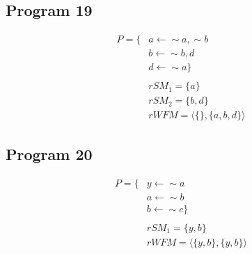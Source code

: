 \subsection{Program 19}
\begin{align*}
P=\{
& a\leftarrow \sim a, \sim b\\
& b\leftarrow \sim b, d\\
& d\leftarrow \sim a
\}\\
\\
& rSM_{1}=\{a\}\\
& rSM_{2}=\{b,d\}\\
& rWFM=\langle\{\},\{a,b,d\}\rangle\end{align*}

\subsection{Program 20}
\begin{align*}
P=\{
& y\leftarrow \sim a\\
& a\leftarrow \sim b\\
& b\leftarrow \sim c
\}\\
\\
& rSM_{1}=\{y,b\}\\
& rWFM=\langle\{y,b\},\{y,b\}\rangle
\end{align*}

